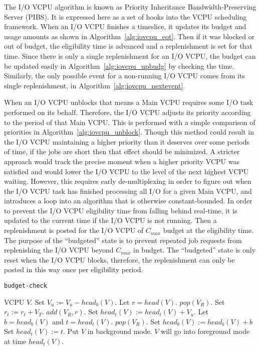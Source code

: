 \documentclass[twocolumn,10pt]{article}
\begin{document}
The I/O VCPU algorithm is known as Priority Inheritance
Bandwidth-Preserving Server (PIBS).  It is expressed here as a set of
hooks into the VCPU scheduling framework.  When an I/O VCPU finishes a
timeslice, it updates its budget and usage amounts as shown in
Algorithm~\ref{alg:iovcpu_eot}.  Then if it was blocked or out of
budget, the eligibility time is advanced and a replenishment is set
for that time.  Since there is only a single replenishment for an I/O
VCPU, the budget can be updated easily in
Algorithm~\ref{alg:iovcpu_upbudg} by checking the time.  Similarly,
the only possible event for a non-running I/O VCPU comes from its
single replenishment, in Algorithm~\ref{alg:iovcpu_nextevent}.

When an I/O VCPU unblocks that means a Main VCPU requires some I/O
task performed on its behalf.  Therefore, the I/O VCPU adjusts its
priority according to the period of that Main VCPU.  This is performed
with a simple comparison of priorities in
Algorithm~\ref{alg:iovcpu_unblock}.  Though this method could result
in the I/O VCPU maintaining a higher priority than it deserves over
some periods of time, if the jobs are short then that effect should be
minimized.  A stricter approach would track the precise moment when a
higher priority VCPU was satisfied and would lower the I/O VCPU to the
level of the next highest VCPU waiting.  However, this requires early
de-multiplexing in order to figure out when the I/O VCPU task has
finished processing all I/O for a given Main VCPU, and introduces a
loop into an algorithm that is otherwise constant-bounded.  In order
to prevent the I/O VCPU eligibility time from falling behind
real-time, it is updated to the current time if the I/O VCPU is not
running.  Then a replenishment is posted for the I/O VCPU of $C_{max}$
budget at the eligibility time.  The purpose of the ``budgeted'' state
is to prevent repeated job requests from replenishing the I/O VCPU
beyond $C_{max}$ in budget.  The ``budgeted'' state is only reset when
the I/O VCPU blocks, therefore, the replenishment can only be posted
in this way once per eligibility period.

\begin{algorithm}[!htb]
  \caption{\tt budget-check}
  \begin{algorithmic}[1]\algorithmsize
    \REQUIRE VCPU $V$.
    \STATE Set $V_u:=V_u-head_b(V)$.
    \STATE Let $r=head(V)$.
    \STATE $pop(V_R)$.
    \STATE Set $r_t:=r_t+V_T$.
    \STATE $add(V_R,r)$.
    \ENDWHILE
    \STATE Set $head_t(V) := head_t(V) + V_u$.
    \STATE Let $b=head_b(V)$ and $t=head_t(V)$.
    \STATE $pop(V_R)$.
    \STATE Set $head_b(V):=head_b(V)+b$ 
    \STATE Set $head_t(V):=t$.
    \ENDIF
    \ENDIF
    \STATE Put $V$ in background mode.
    \STATE $V$ will go into foreground mode at time $head_t(V)$.
    \ENDIF
    \ENDIF
    \ENDIF
  \end{algorithmic}
  \label{alg:budget_check}
\end{algorithm}
\end{document}
